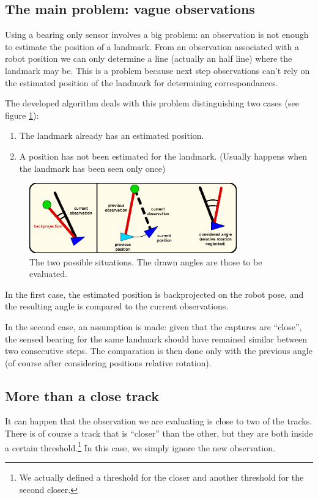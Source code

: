 \subsection{The main problem: vague observations}
Using a bearing only sensor involves a big problem: an observation is not enough to estimate the position of a landmark.
From an observation associated with a robot position we can only determine a line (actually an half line) where the landmark may be.
This is a problem because next step observations can't rely on the estimated position of the landmark for determining correspondances.

The developed algorithm deals with this problem distinguishing two cases (see figure \ref{fig:observation_association}):
\begin{enumerate}
  \item The landmark already has an estimated position.
  \item A position has not been estimated for the landmark. (Usually happens when the landmark has been seen only once)
\end{enumerate}
\begin{figure}[htbp]
  \centering
    \includegraphics[width=0.8\textwidth]{images/observation_association.png}
  \caption{The two possible situations. The drawn angles are those to be evaluated.}
  \label{fig:observation_association}
\end{figure}
In the first case, the estimated position is backprojected on the robot pose, and the resulting angle is compared to the current observations.

In the second case, an assumption is made: given that the captures are ``close'', the sensed bearing for the same landmark should have remained similar between two consecutive steps. The comparation is then done only with the previous angle (of course after considering positions relative rotation).

\subsection{More than a close track}\label{subsec:twotracks}
It can happen that the observation we are evaluating is close to two of the tracks. There is of course a track that is ``closer'' than the other, but they are both inside a certain threshold.\footnote{We actually defined a threshold for the closer and another threshold for the second closer.}
In this case, we simply ignore the new observation.

